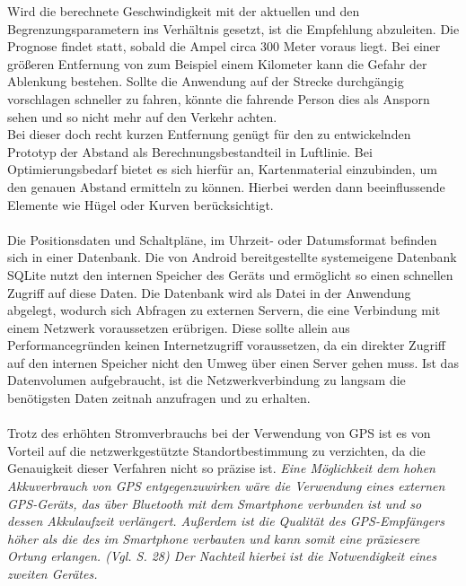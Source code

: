 Wird die berechnete Geschwindigkeit mit der aktuellen und den Begrenzungsparametern ins Verhältnis gesetzt, ist die Empfehlung abzuleiten. Die Prognose findet statt, sobald die Ampel circa 300 Meter voraus liegt. Bei einer größeren Entfernung von zum Beispiel einem Kilometer kann die Gefahr der Ablenkung bestehen. Sollte die Anwendung auf der Strecke durchgängig vorschlagen schneller zu fahren, könnte die fahrende Person dies als Ansporn sehen und so nicht mehr auf den Verkehr achten.\\
Bei dieser doch recht kurzen Entfernung genügt für den zu entwickelnden Prototyp der Abstand als Berechnungsbestandteil in Luftlinie. Bei Optimierungsbedarf bietet es sich hierfür an, Kartenmaterial einzubinden, um den genauen Abstand ermitteln zu können. Hierbei werden dann beeinflussende Elemente wie Hügel oder Kurven berücksichtigt.\\\\
Die Positionsdaten und Schaltpläne, im Uhrzeit- oder Datumsformat befinden sich in einer Datenbank. Die von Android bereitgestellte systemeigene Datenbank SQLite nutzt den internen Speicher des Geräts und ermöglicht so einen schnellen Zugriff auf diese Daten. Die Datenbank wird als Datei in der Anwendung abgelegt, wodurch sich Abfragen zu externen Servern, die eine Verbindung mit einem Netzwerk voraussetzen erübrigen. Diese sollte allein aus Performancegründen keinen Internetzugriff voraussetzen, da ein direkter Zugriff auf den internen Speicher nicht den Umweg über einen Server gehen muss. Ist das Datenvolumen aufgebraucht, ist die Netzwerkverbindung zu langsam die benötigsten Daten zeitnah anzufragen und zu erhalten.\\\\
Trotz des erhöhten Stromverbrauchs bei der Verwendung von \gls{GPS} ist es von Vorteil auf die netzwerkgestützte Standortbestimmung zu verzichten, da die Genauigkeit dieser Verfahren nicht so präzise ist. 
\textit{Eine Möglichkeit dem hohen Akkuverbrauch von \gls{GPS} entgegenzuwirken wäre die Verwendung eines externen \gls{GPS}-Geräts, das über Bluetooth mit dem \gls{Smartphone} verbunden ist und so dessen Akkulaufzeit verlängert. Außerdem ist die Qualität des \gls{GPS}-Empfängers höher als die des im \gls{Smartphone} verbauten und kann somit eine präziesere Ortung erlangen. (Vgl. \cite{gps} S. 28) Der Nachteil hierbei ist die Notwendigkeit eines zweiten Gerätes.} 
